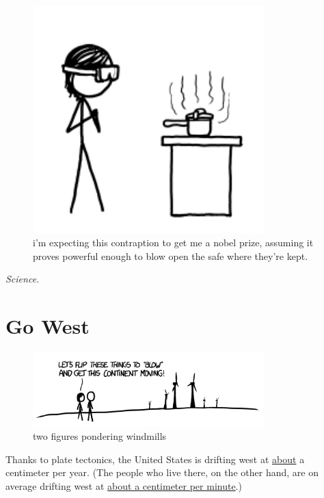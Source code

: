 \begin{figure}[!htbp]
\centering
\includegraphics[scale=0.5, max width=0.8\textwidth]{imgs/a/40/pressure_cooker_science.png}
\caption{i’m expecting this contraption to get me a nobel prize, assuming it proves powerful enough to blow open the safe where they’re kept.}
\end{figure}

{ \emph{Science.} }

{
\chapter{Go West}
}

\hfill{}

\begin{figure}[!htbp]
\centering
\includegraphics[scale=0.5, max width=0.8\textwidth]{imgs/a/41/go_west_windmills.png}
\caption{two figures pondering windmills}
\end{figure}

{Thanks to plate tectonics, the United States is drifting west at \href{http://hypertextbook.com/facts/ZhenHuang.shtml}{about} a centimeter per year. (The people who live there, on the other hand, are on average drifting west at \href{http://www.census.gov/newsroom/releases/archives/facts\_for\_features\_special\_editions/cb11ff10.html} {about a centimeter per minute}.)}


